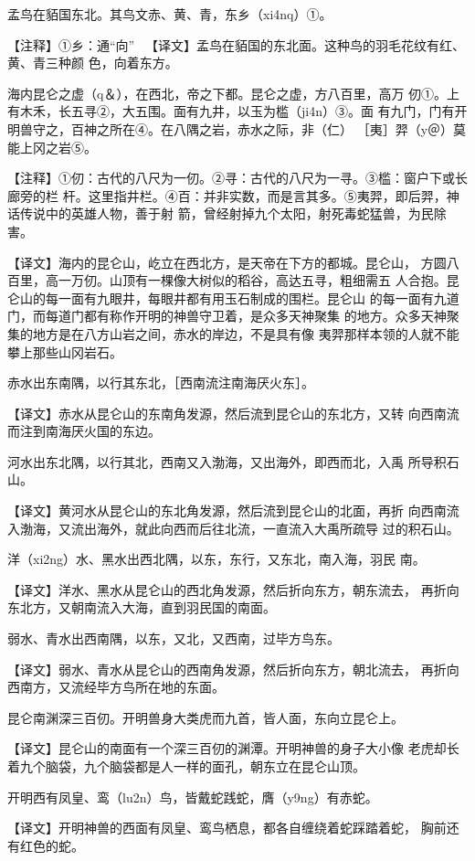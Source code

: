 \documentclass[a4paper,12pt,UTF8,twoside]{ctexbook}
\begin{document}
孟鸟在貊国东北。其鸟文赤、黄、青，东乡（xi4nq）①。

【注释】①乡：通“向” 　【译文】孟鸟在貊国的东北面。这种鸟的羽毛花纹有红、黄、青三种颜 色，向着东方。

海内昆仑之虚（q＆），在西北，帝之下都。昆仑之虚，方八百里，高万 仞①。上有木禾，长五寻②，大五围。面有九井，以玉为槛（ji4n）③。面 有九门，门有开明兽守之，百神之所在④。在八隅之岩，赤水之际，非（仁） ［夷］羿（y＠）莫能上冈之岩⑤。

【注释】①仞：古代的八尺为一仞。②寻：古代的八尺为一寻。③槛：窗户下或长廊旁的栏 杆。这里指井栏。④百：并非实数，而是言其多。⑤夷羿，即后羿，神话传说中的英雄人物，善于射 箭，曾经射掉九个太阳，射死毒蛇猛兽，为民除害。

【译文】海内的昆仑山，屹立在西北方，是天帝在下方的都城。昆仑山， 方圆八百里，高一万仞。山顶有一棵像大树似的稻谷，高达五寻，粗细需五 人合抱。昆仑山的每一面有九眼井，每眼井都有用玉石制成的围栏。昆仑山 的每一面有九道门，而每道门都有称作开明的神兽守卫着，是众多天神聚集 的地方。众多天神聚集的地方是在八方山岩之间，赤水的岸边，不是具有像 夷羿那样本领的人就不能攀上那些山冈岩石。

赤水出东南隅，以行其东北，［西南流注南海厌火东］。

【译文】赤水从昆仑山的东南角发源，然后流到昆仑山的东北方，又转 向西南流而注到南海厌火国的东边。

河水出东北隅，以行其北，西南又入渤海，又出海外，即西而北，入禹 所导积石山。

【译文】黄河水从昆仑山的东北角发源，然后流到昆仑山的北面，再折 向西南流入渤海，又流出海外，就此向西而后往北流，一直流入大禹所疏导 过的积石山。

洋（xi2ng）水、黑水出西北隅，以东，东行，又东北，南入海，羽民 南。

【译文】洋水、黑水从昆仑山的西北角发源，然后折向东方，朝东流去， 再折向东北方，又朝南流入大海，直到羽民国的南面。

弱水、青水出西南隅，以东，又北，又西南，过毕方鸟东。

【译文】弱水、青水从昆仑山的西南角发源，然后折向东方，朝北流去， 再折向西南方，又流经毕方鸟所在地的东面。

昆仑南渊深三百仞。开明兽身大类虎而九首，皆人面，东向立昆仑上。

【译文】昆仑山的南面有一个深三百仞的渊潭。开明神兽的身子大小像 老虎却长着九个脑袋，九个脑袋都是人一样的面孔，朝东立在昆仑山顶。

开明西有凤皇、鸾（lu2n）鸟，皆戴蛇践蛇，膺（y9ng）有赤蛇。

【译文】开明神兽的西面有凤皇、鸾鸟栖息，都各自缠绕着蛇踩踏着蛇， 胸前还有红色的蛇。
\end{document}
